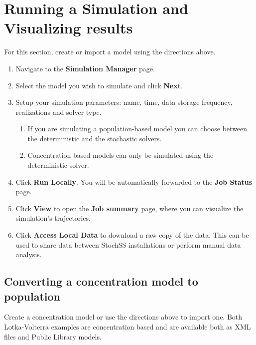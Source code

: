 \section{Running a Simulation and Visualizing results}

For this section, create or import a model using the directions above.

\begin{enumerate}
  \item Navigate to the \textbf{Simulation Manager} page.
  \item Select the model you wish to simulate and click \textbf{Next}.
  \item Setup your simulation parameters: name, time, data storage frequency, realizations and solver type. 
  \begin{enumerate}
    \item If you are simulating a population-based model you can choose between the deterministic and the stochastic solvers.
    \item Concentration-based models can only be simulated using the deterministic solver.
  \end{enumerate}  
  \item Click \textbf{Run Locally}. You will be automatically forwarded to the \textbf{Job Status} page.%
  \item Click \textbf{View} to open the \textbf{Job summary} page, where you can visualize the simulation's trajectories.
  \item Click \textbf{Access Local Data} to download a raw copy of the data. This can be used to share data between StochSS installations or perform manual data analysis.
\end{enumerate}

\subsection{Converting a concentration model to population}
Create a concentration model or use the directions above to import one. Both Lotka-Volterra examples are concentration based and are available both as XML files and Public Library models.

